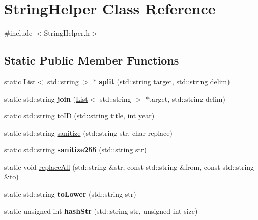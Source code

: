 \hypertarget{class_string_helper}{}\section{String\+Helper Class Reference}
\label{class_string_helper}


{\ttfamily \#include $<$String\+Helper.\+h$>$}

\subsection*{Static Public Member Functions}
\begin{DoxyCompactItemize}
\item 
\mbox{\label{class_string_helper_ac610979af20128f886c9f3f885ce5140}} 
static \hyperlink{class_list}{List}$<$ std\+::string $>$ $\ast$ {\bfseries split} (std\+::string target, std\+::string delim)
\item 
\mbox{\label{class_string_helper_a253f897eafd0d819e28aeae144bb6f14}} 
static std\+::string {\bfseries join} (\hyperlink{class_list}{List}$<$ std\+::string $>$ $\ast$target, std\+::string delim)
\item 
static std\+::string \hyperlink{class_string_helper_af1ebd6032d273477815fb71d50c47a82}{to\+ID} (std\+::string title, int year)
\item 
static std\+::string \hyperlink{class_string_helper_ae7ed857566d41bb983185121d9a85dd9}{sanitize} (std\+::string str, char replace)
\item 
\mbox{\label{class_string_helper_a223084cf59ad8cce78fd5d1e6543e0ce}} 
static std\+::string {\bfseries sanitize255} (std\+::string str)
\item 
static void \hyperlink{class_string_helper_a1e284887e820c917f1ad0e5358e8afda}{replace\+All} (std\+::string \&str, const std\+::string \&from, const std\+::string \&to)
\item 
\mbox{\label{class_string_helper_a731346b2d686aa86d3a97ae7a0ec01ac}} 
static std\+::string {\bfseries to\+Lower} (std\+::string str)
\item 
\mbox{\label{class_string_helper_a9623fcf0dcb856197bf535d6ecc61798}} 
static unsigned int {\bfseries hash\+Str} (std\+::string str, unsigned int size)

\end{DoxyCompactItemize}
